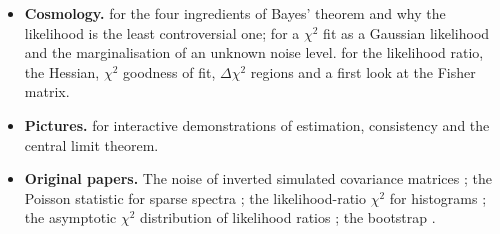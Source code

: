 \begin{itemize}[leftmargin=1.2em,itemsep=2pt]
        in  sufficiency and the factorisation
        theorem, in  Bayes estimators, and in
         mean squared error, the Cram\'er--Rao
        inequality with its attainment condition, and the Rao--Blackwell and
        Lehmann--Scheff\'e theorems.
  \item \textbf{Cosmology.}  for the four
        ingredients of Bayes' theorem and why the likelihood is the least
        controversial one;  for a $\chi^2$ fit as a
        Gaussian likelihood and the marginalisation of an unknown noise
        level.  for the likelihood ratio, the
        Hessian, $\chi^2$ goodness of fit, $\Delta\chi^2$ regions and a first
        look at the Fisher matrix.
  \item \textbf{Pictures.}  for
        interactive demonstrations of estimation, consistency and the
        central limit theorem.
  \item \textbf{Original papers.} The noise of inverted simulated
        covariance matrices \cite{Hartlap2007}; the Poisson statistic for
        sparse spectra \cite{Cash1979}; the likelihood-ratio $\chi^2$ for
        histograms \cite{BakerCousins1984}; the asymptotic $\chi^2$
        distribution of likelihood ratios \cite{Wilks1938}; the bootstrap
        \cite{Efron1979}.
\end{itemize}
  
